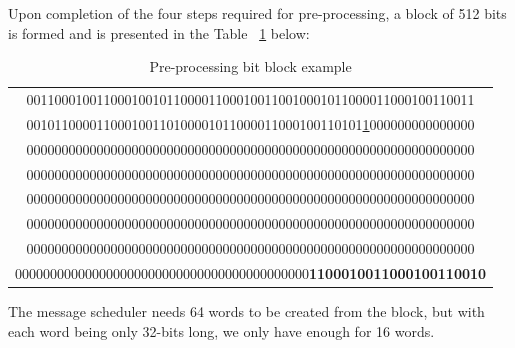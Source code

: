         Upon completion of the four steps required for pre-processing, a block of 512 bits is formed and is presented in the Table ~\ref{table:Pre-processing bit block example} below:
        \begin{table}[h]
            
            \caption{Pre-processing bit block example}
            \label{table:Pre-processing bit block example}
            \begin{center}
            \begin{tabular}{|c|}
             \hline     
             0011000100110001001011000011000100110010001011000011000100110011 \\
             001011000011000100110100001011000011000100110101\underline{1}000000000000000 \\
             0000000000000000000000000000000000000000000000000000000000000000 \\
             0000000000000000000000000000000000000000000000000000000000000000 \\
             0000000000000000000000000000000000000000000000000000000000000000 \\
             0000000000000000000000000000000000000000000000000000000000000000 \\
             0000000000000000000000000000000000000000000000000000000000000000 \\
             000000000000000000000000000000000000000000\textbf{1100010011000100110010} \\
             \hline
            \end{tabular}
            \end{center}
            
        \end{table}
        
        The message scheduler needs 64 words to be created from the block, but with each word being only 32-bits long, we only have enough for 16 words. 
        
